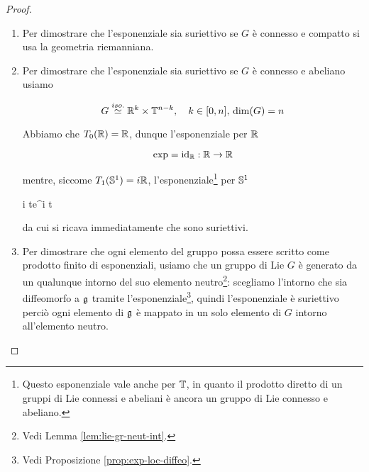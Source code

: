 \begin{proof}\hfill\break
	\begin{enumerate}
		\item Per dimostrare che l'esponenziale sia suriettivo se $ G $ è connesso e compatto si usa la geometria riemanniana.
		
		\item Per dimostrare che l'esponenziale sia suriettivo se $ G $ è connesso e abeliano usiamo
		
		\begin{equation}
			G \stackrel{iso.}{\simeq} \R^{k} \times \T^{n-k} \qcomma k \in [0,n], \, \dim(G) = n
		\end{equation}
		
		Abbiamo che $ T_{0}(\R) = \R $, dunque l'esponenziale per $ \R $
		
		\begin{equation}
			\exp = \id_{\R} : \R \to \R
		\end{equation}
		
		mentre, siccome $ T_{1}(\S^{1}) = i \R $, l'esponenziale\footnote{%
			Questo esponenziale vale anche per $ \T $, in quanto il prodotto diretto di un gruppi di Lie connessi e abeliani è ancora un gruppo di Lie connesso e abeliano.%
		} per $ \S^{1} $
		
		\map{\exp}
			{i \R}{\R}
			{t}{e^{i t}}
		
		da cui si ricava immediatamente che sono suriettivi.
		
		\item Per dimostrare che ogni elemento del gruppo possa essere scritto come prodotto finito di esponenziali, usiamo che un gruppo di Lie $ G $ è generato da un qualunque intorno del suo elemento neutro\footnote{%
			Vedi Lemma \ref{lem:lie-gr-neut-int}.%
		}: scegliamo l'intorno che sia diffeomorfo a $ \g $ tramite l'esponenziale\footnote{%
			Vedi Proposizione \ref{prop:exp-loc-diffeo}.%
		}, quindi l'esponenziale è suriettivo perciò ogni elemento di $ \g $ è mappato in un solo elemento di $ G $ intorno all'elemento neutro.
	\end{enumerate}
\end{proof}

